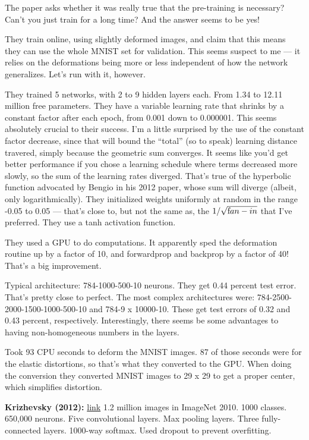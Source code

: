 \documentclass[12pt]{article}
\newcommand{\link}[2]{\href{#1}{#2}}
\begin{document}
The paper asks whether it was really true that the pre-training is
necessary?  Can't you just train for a long time?  And the answer
seems to be yes!

They train online, using slightly deformed images, and claim that this
means they can use the whole MNIST set for validation.  This seems
suspect to me --- it relies on the deformations being more or less
independent of how the network generalizes.  Let's run with it,
however.

They trained 5 networks, with 2 to 9 hidden layers each.  From 1.34 to
12.11 million free parameters.  They have a variable learning rate
that shrinks by a constant factor after each epoch, from 0.001 down to
0.000001.  This seems absolutely crucial to their success. I'm a
little surprised by the use of the constant factor decrease, since
that will bound the ``total'' (so to speak) learning distance
travered, simply because the geometric sum converges.  It seems like
you'd get better performance if you chose a learning schedule where
terms decreased more slowly, so the sum of the learning rates
diverged.  That's true of the hyperbolic function advocated by Bengio
in his 2012 paper, whose sum will diverge (albeit, only
logarithmically).  They initialized weights uniformly at random in the
range -0.05 to 0.05 --- that's close to, but not the same as, the
$1/\sqrt{\mbox fan-in}$ that I've preferred.  They use a tanh
activation function.

They used a GPU to do computations.  It apparently sped the
deformation routine up by a factor of 10, and forwardprop and backprop
by a factor of 40!  That's a big improvement.

Typical architecture: 784-1000-500-10 neurons.  They get 0.44 percent
test error.  That's pretty close to perfect.  The most complex
architectures were: 784-2500-2000-1500-1000-500-10 and 784-9 x
10000-10.  These get test errors of 0.32 and 0.43 percent,
respectively.  Interestingly, there seems be some advantages to having
non-homogeneous numbers in the layers.

Took 93 CPU seconds to deform the MNIST images.  87 of those seconds
were for the elastic distortions, so that's what they converted to the
GPU.  When doing the conversion they converted MNIST images to 29 x 29
to get a proper center, which simplifies distortion.

\textbf{Krizhevsky (2012):}
\link{http://www.cs.toronto.edu/~hinton/absps/imagenet.pdf}{link} 1.2
million images in ImageNet 2010.  1000 classes.  650,000 neurons.
Five convolutional layers.  Max pooling layers.  Three fully-connected
layers.  1000-way softmax.  Used dropout to prevent overfitting.
\end{document}
